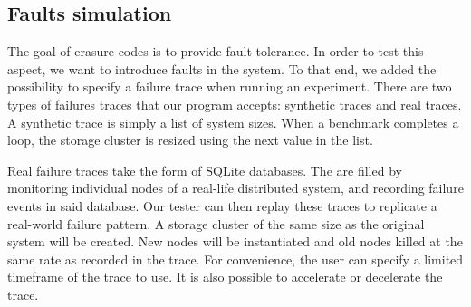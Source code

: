 \subsection{Faults simulation}

The goal of erasure codes is to provide fault tolerance.
In order to test this aspect, we want to introduce faults in the system.
To that end, we added the possibility to specify a failure trace when running an experiment.
There are two types of failures traces that our program accepts: synthetic traces and real traces.
A synthetic trace is simply a list of system sizes.
When a benchmark completes a loop, the storage cluster is resized using the next value in the list.

Real failure traces take the form of SQLite databases.
The are filled by monitoring individual nodes of a real-life distributed system, and recording failure events in said database.
Our tester can then replay these traces to replicate a real-world failure pattern.
A storage cluster of the same size as the original system will be created.
New nodes will be instantiated and old nodes killed at the same rate as recorded in the trace.
For convenience, the user can specify a limited timeframe of the trace to use.
It is also possible to accelerate or decelerate the trace.
